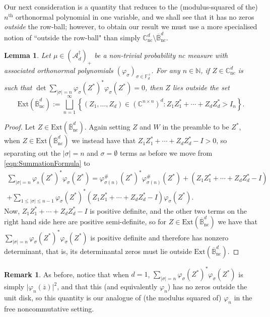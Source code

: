 \documentclass[11pt,reqno]{amsart}
\newcommand\ncm[1]{(\mathscr{A}_{#1}^{\dagger})_+}
\def\p{\varphi}
\def\s{\sigma}
\def\NN{\mathbb{N}}
\def\CC{\mathbb{C}}
\def\BB{\mathbb{B}}
\def\FF{\mathbb{F}}
\def\nc{\mathrm{nc}}
\def\dju{\bigsqcup_{n=1}^{\infty}}
\newtheorem{lemma}[theorem]{Lemma}
\theoremstyle{definition}
\newtheorem{remark}[theorem]{Remark}
\numberwithin{equation}{section}
\begin{document}
Our next consideration is a quantity that reduces to the (modulus-squared of the) \(n^{\mathrm{th}}\) orthonormal polynomial in one variable, and we shall see that it has no zeros \emph{outside} the row-ball; however, to obtain our result we must use a more specialised notion of ``outside the row-ball" than simply \(\CC_\nc^d \setminus \overline{\BB}_\nc^d\).

\begin{lemma}
    \label{lem:ZerosInside}
    Let \(\mu \in \ncm{d}\) be a non-trivial probability nc measure with associated orthonormal polynomials \((\p_\s)_{\s \in \FF_d^+}\). For any \(n \in \NN\), if \(Z \in \CC_\nc^d\) is such that \(\det \sum_{\lvert \s \rvert = n} \p_\s(Z^*)^* \p_\s(Z^*) = 0\), then \(Z\) lies outside the set
    \[
        \mathrm{Ext}(\overline{\BB}^d_{\nc}) := \dju \left\{(Z_1, \ldots, Z_d) \in (\CC^{n \times n})^d : Z_1Z_1^* + \cdots + Z_dZ_d^* > I_n \right\}.
    \]
\end{lemma}
\begin{proof}
    Let \(Z \in \mathrm{Ext}(\overline{\BB}^d_{\nc})\). Again setting \(Z\) and \(W\) in the preamble to be \(Z^*\), when \(Z \in \mathrm{Ext}(\overline{\BB}^d_{\nc})\) we instead have that \(Z_1Z_1^* + \cdots + Z_dZ_d^* - I > 0\), so separating out the \(\lvert \s \rvert = n\) and \(\s = \emptyset\) terms as before we move from \eqref{eqn:SummationFormula} to
    \begin{multline*}
        \sum_{\lvert \s \rvert = n} \p_s(Z^*)^*\p_\s(Z^*) = \p_{\s(n)}^\#(Z^*)^*\p_{\s(n)}^\#(Z^*) + (Z_1Z_1^* + \cdots + Z_dZ_d^* - I) \\ + \sum_{1 \leq \lvert \s \rvert \leq n-1} \p_\s(Z^*)^*(Z_1Z_1^* + \cdots + Z_dZ_d^* - I)\p_\s(Z^*).
    \end{multline*}
    Now, \(Z_1Z_1^* + \cdots + Z_dZ_d^* - I\) is positive definite, and the other two terms on the right hand side here are positive semi-definite, so for \(Z \in \mathrm{Ext}(\overline{\BB}^d_{\nc})\) we have that \(\sum_{\lvert \s \rvert = n} \p_\s(Z^*)^* \p_\s(Z^*)\) is positive definite and therefore has nonzero determinant, that is, its determinantal zeros must lie outside \(\mathrm{Ext}(\overline{\BB}^d_{\nc})\).
\end{proof}

\begin{remark}
    As before, notice that when \(d = 1\), \(\sum_{\lvert \s \rvert = n} \p_\s(Z^*)^* \p_\s(Z^*)\) is simply \(\lvert\p_n(\overline{z})\rvert^2\), and that this (and equivalently \(\p_n\)) has no zeros outside the unit disk, so this quantity is our analogue of (the modulus squared of) \(\p_n\) in the free noncommutative setting.
\end{remark}
\end{document}
